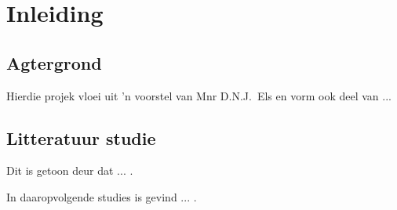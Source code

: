 \chapter{Inleiding}
\section{Agtergrond}

Hierdie projek vloei uit 'n voorstel van Mnr D.N.J.\ Els en vorm
ook deel van ...

\section{Litteratuur studie}

Dit is getoon deur \citet{Lin:1997} dat ... .

In daaropvolgende studies \citep{Luding:1998} is gevind ... .
